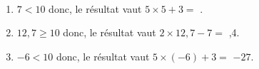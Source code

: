 \ \\ [-5mm]
   \begin{enumerate}
      \item $7<10$ donc, le résultat vaut $5\times5+3 =$ {}.
      \item $12,7\geq10$ donc, le résultat vaut $2\times12,7-7 =$ {,4}.
      \item $-6<10$ donc, le résultat vaut $5\times(-6)+3=$ {\blue $-27$}.
   \end{enumerate}
